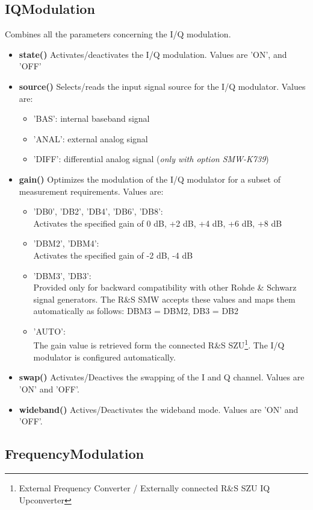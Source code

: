 \documentclass[11pt]{article} %
\begin{document}
\subsection{IQModulation}

Combines all the parameters concerning the I/Q modulation.
\begin{itemize}
\item {\bf state()} Activates/deactivates the I/Q modulation. Values are 'ON', and 'OFF'
\item {\bf source()} Selects/reads the input signal source for the I/Q modulator. Values are:
	\begin{itemize}[]
	\item 'BAS': internal baseband signal
	\item 'ANAL': external analog signal 
	\item 'DIFF': differential analog signal ({\it only with option SMW-K739})
	\end{itemize}
\item {\bf gain()} Optimizes the modulation of the I/Q modulator for a subset of measurement requirements. Values are:
	\begin{itemize}[]
	\item 'DB0', 'DB2', 'DB4', 'DB6', 'DB8': \\
		Activates the specified gain of 0 dB, +2 dB, +4 dB, +6 dB, +8 dB
	\item 'DBM2', 'DBM4': \\
		Activates the specified gain of -2 dB, -4 dB
	\item 'DBM3', 'DB3': \\
		Provided only for backward compatibility with other Rohde \& Schwarz signal generators. The R\&S SMW accepts these values and maps them automatically as follows: DBM3 = DBM2, DB3 = DB2
	\item 'AUTO': \\
		The gain value is retrieved form the connected R\&S SZU\footnote{External Frequency Converter / Externally connected R\&S SZU IQ Upconverter}. The I/Q modulator is configured automatically.
	\end{itemize}
\item {\bf swap()} Activates/Deactives the swapping of the I and Q channel. Values are 'ON' and 'OFF'.
\item {\bf wideband()} Actives/Deactivates the wideband mode. Values are 'ON' and 'OFF'.
\end{itemize}


\subsection{FrequencyModulation}
\end{document}
